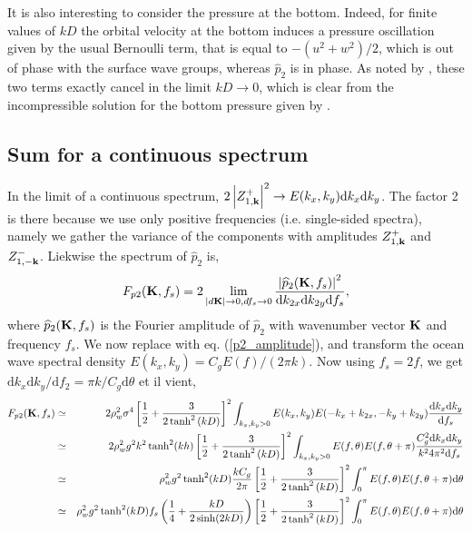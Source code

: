It is also interesting to consider the pressure at the bottom. Indeed, for finite values of $kD$ the orbital velocity at the bottom 
induces a pressure oscillation given by the usual Bernoulli term,  that is equal to $-(u^2+w^2)/2$, which is out of phase with the surface wave groups, whereas 
$\widehat{p}_{2}$ is in phase. As noted by \cite{Ardhuin&Herbers2013}, these two terms exactly cancel in the limit $kD \rightarrow 0$, which is clear 
from the incompressible solution for the bottom pressure given by \cite{Herbers&Guza1991}.

\subsection{Sum for a continuous spectrum}
In the limit of a continuous spectrum, $2 \left|Z_{1,\mathbf{k}}^{+}\right|^2 \rightarrow E(k_x,k_y) \mathrm{d}k_x \mathrm{d}k_y$. The factor 2 is there 
because we use only positive frequencies (i.e. single-sided spectra), namely we gather the variance of the components with amplitudes $Z_{1,\mathbf{k}}^{+}$ and $Z_{1,-\mathbf{k}}^{-}$. 
Liekwise the spectrum of  $\widehat{p}_{2}$ is, 
\begin{equation}
F_{p2}(\mathbf{K},f_s) = 2 \lim_{\left|d \mathbf{K}\right| \rightarrow 0, df_s \rightarrow 0} \frac{\left|\widehat{p}_{2}(\mathbf{K},f_s) \right|^2}
{\mathrm{d}k_{2x} \mathrm{d}k_{2y} \mathrm{d} f_s}, 
\end{equation}
where $\widehat{p}_{2}(\mathbf{K},f_s)$ is the Fourier amplitude of  $\widehat{p}_{2}$ with wavenumber vector  $\mathbf{K}$  and frequency  $f_s$. 
We now replace with eq. (\ref{p2_amplitude}), and transform the ocean wave spectral density  $E(k_x,k_y)={ C_g} E(f)/({2 \pi k})$. Now using  $f_s = 2 f$, we get 
$\mathrm{d}k_x \mathrm{d}k_y /\mathrm{d} f_2= {\pi k}/C_g \mathrm{d} \theta$ et il vient, 
\begin{eqnarray}
     F_{p2}(\mathbf{K},f_s)  &\simeq & 2 \rho_w^2 \sigma^4 \left[\frac{1}{2} + \frac{3}{2\tanh^2 \left(k D \right)} \right]^2 
     \int_{k_x,k_y > 0} E(k_x,k_y) E(-k_x+k_{2x},-k_y+k_{2y}) \frac{\mathrm{d}k_x \mathrm{d}k_y }{\mathrm{d} f_s}  \\
  &\simeq & 2 \rho_w^2 g^2 k^2 \tanh^2(kh)  \left[\frac{1}{2} + \frac{3}{2\tanh^2 \left(k D \right)} \right]^2 
     \int_{k_x,k_y > 0} E(f,\theta) E(f,\theta+\pi) \frac{C_g^2 \mathrm{d}k_x \mathrm{d}k_y }{k^2 4 \pi^2 \mathrm{d} f_s}  \\
&\simeq & \rho_w^2 g^2 \tanh^2(kD) \frac{k C_g }{ 2 \pi}  \left[\frac{1}{2} + \frac{3}{2\tanh^2 \left(k D \right)} \right]^2 
     \int_{0}^{\pi}  E(f,\theta) E(f,\theta+\pi)  \mathrm{d} \theta  \\
&\simeq & \rho_w^2 g^2 \tanh^2(kD) f_s \left(\frac{1}{4}+\frac{kD}{2 \sinh(2kD)} \right) \left[\frac{1}{2} + \frac{3}{2\tanh^2 \left(k D \right)} \right]^2 
     \int_{0}^{\pi}  E(f,\theta) E(f,\theta+\pi)  \mathrm{d} \theta  \nonumber\\
\label{p2_spectrum}
\end{eqnarray}

